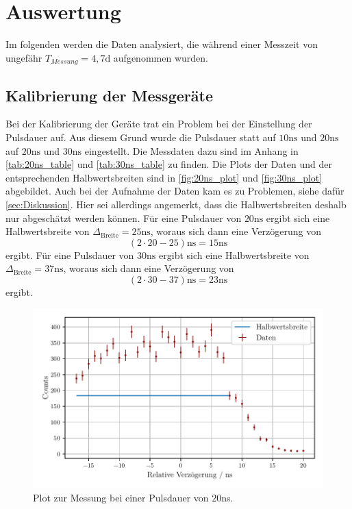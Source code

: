\section{Auswertung}
\label{sec:Auswertung}

Im folgenden werden die Daten analysiert, die während einer Messzeit von ungefähr $T_{Messung} = 4,7  \unit\day$ aufgenommen wurden.

\subsection{Kalibrierung der Messgeräte}

Bei der Kalibrierung der Geräte trat ein Problem bei der Einstellung der Pulsdauer auf.
Aus diesem Grund wurde die Pulsdauer statt auf $10 \unit{\nano\second}$ und $20 \unit{\nano\second}$ auf $20 \unit{\nano\second}$ und $30 \unit{\nano\second}$ eingestellt.
Die Messdaten dazu sind im Anhang in \autoref{tab:20ns_table} und \autoref{tab:30ns_table} zu finden.
Die Plots der Daten und der entsprechenden Halbwertsbreiten sind in \autoref{fig:20ns_plot} und \autoref{fig:30ns_plot} abgebildet.
Auch bei der Aufnahme der Daten kam es zu Problemen, siehe dafür \autoref{sec:Diskussion}.
Hier sei allerdings angemerkt, dass die Halbwertsbreiten deshalb nur abgeschätzt werden können.
Für eine Pulsdauer von $20 \unit{\nano\second}$ ergibt sich eine Halbwertsbreite von $\Delta_\text{Breite} = 25 \unit{\nano\second}$, woraus sich dann eine Verzögerung von
\begin{equation*}
    (2 \cdot 20 - 25) \unit{\nano\second} = 15 \unit{\nano\second}  
\end{equation*}
ergibt.
Für eine Pulsdauer von $30 \unit{\nano\second}$ ergibt sich eine Halbwertsbreite von $\Delta_\text{Breite} = 37 \unit{\nano\second}$, woraus sich dann eine Verzögerung von
\begin{equation*}
    (2 \cdot 30 - 37) \unit{\nano\second} = 23 \unit{\nano\second}  
\end{equation*}
ergibt.

\begin{figure}
    \centering
    \includegraphics[width = 0.7 \linewidth]{build/20ns_plot.pdf}
    \caption{Plot zur Messung bei einer Pulsdauer von $20$ns.}
    \label{fig:20ns_plot}
\end{figure}

